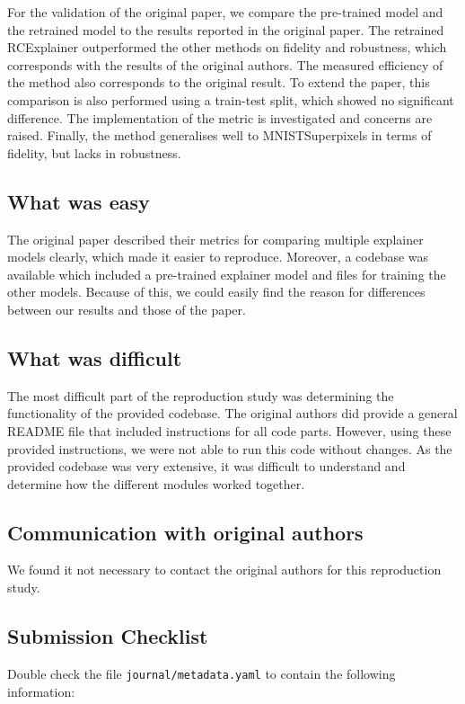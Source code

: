For the validation of the original paper, we compare the pre-trained model and the retrained model to the results reported in the original paper. The retrained RCExplainer outperformed the other methods on fidelity and robustness, which corresponds with the results of the original authors. The measured efficiency of the method also corresponds to the original result. To extend the paper, this comparison is also performed using a train-test split, which showed no significant difference. The implementation of the metric is investigated and concerns are raised. Finally, the method generalises well to MNISTSuperpixels in terms of fidelity, but lacks in robustness.


\subsection*{What was easy}
The original paper described their metrics for comparing multiple explainer models clearly, which made it easier to reproduce. Moreover, a codebase was available which included a pre-trained explainer model and files for training the other models. Because of this, we could easily find the reason for differences between our results and those of the paper.

\subsection*{What was difficult}
The most difficult part of the reproduction study was determining the functionality of the provided codebase. The original authors did provide a general README file that included instructions for all code parts. However, using these provided instructions, we were not able to run this code without changes. As the provided codebase was very extensive, it was difficult to understand and determine how the different modules worked together.

\subsection*{Communication with original authors}
We found it not necessary to contact the original authors for this reproduction study.

\subsection{Submission Checklist}

Double check the file \texttt{journal/metadata.yaml} to contain the following information:

